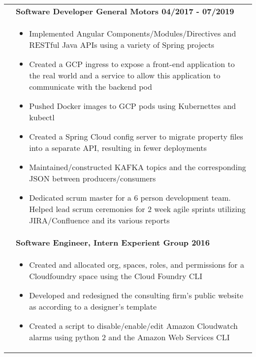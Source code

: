 \documentclass[final]{letter}
\begin{document}
\begin{center}
\begin{tabularx}{\linewidth}{>{\raggedright\bf\Large{}}p{10.75em}X}
			& \large\bf{Software Developer \hfill {General Motors} \hfill 04/2017 - 07/2019 } \\
			& \begin{itemize}[noitemsep,topsep=0pt]\setlength\itemsep{2px}
				\item Implemented Angular Components/Modules/Directives and RESTful Java APIs using a variety of Spring projects  
				\item Created a GCP ingress to expose a front-end application to the real world and a service to allow this application to communicate with the backend pod
				\item Pushed Docker images to GCP pods using Kubernettes and kubectl
				\item Created a Spring Cloud config server to migrate property files into a separate API, resulting in fewer deployments
				\item Maintained/constructed KAFKA topics and the corresponding JSON between producers/consumers
				\item Dedicated scrum master for a 6 person development team. Helped lead scrum ceremonies for 2 week agile sprints utilizing JIRA/Confluence and its various reports
			\end{itemize} \\
		
			& \large\bf{Software Engineer, Intern \hfill {Experient Group} \hfill 2016} \\
			& \begin{itemize}[noitemsep,topsep=0pt]\setlength\itemsep{2px}
				\item Created and allocated org, spaces, roles, and permissions for a Cloudfoundry space using the Cloud Foundry CLI
				\item Developed and redesigned the consulting firm's public website as according to a designer's template
				\item Created a script to disable/enable/edit Amazon Cloudwatch alarms using python 2 and the Amazon Web Services CLI
			\end{itemize} \\
		\end{tabularx} \\


\end{center}
\end{document}
